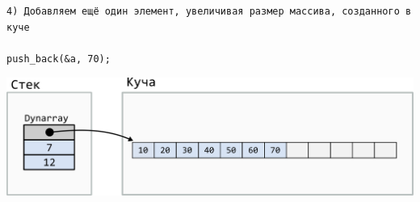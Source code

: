 \documentclass[10pt]{article}
\begin{document}
\noindent\begin{minipage}{.40\textwidth}
\begin{lstlisting}
4) Добавляем ещё один элемент, увеличивая размер массива, созданного в куче

push_back(&a, 70);
\end{lstlisting}
\end{minipage}
\begin{minipage}{.50\textwidth}
\includegraphics[scale=0.8]{../images/dynarray4.png}
\end{minipage}
\quad\\
\quad\\
\quad\\


\newpage
\end{document}
